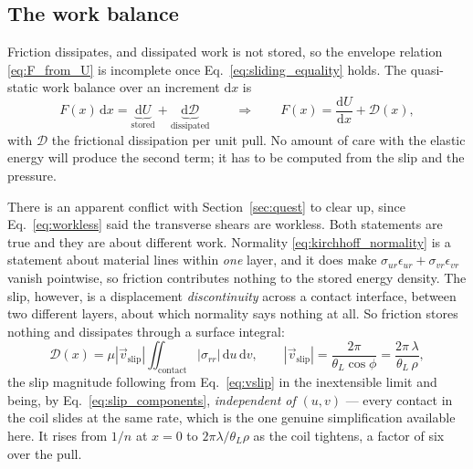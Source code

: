 \documentclass[11pt]{article}
\begin{document}
\subsection{The work balance}\label{sec:work_balance}
Friction dissipates,
and dissipated work is not stored, so the envelope relation
\eqref{eq:F_from_U} is incomplete once Eq.~\eqref{eq:sliding_equality} holds.
The quasi-static work balance over an increment $\mathrm dx$ is
\begin{equation}\label{eq:work_balance}
    \boxed{\;F\left(x\right)\,\mathrm dx
      = \underbrace{\mathrm dU}_{\text{stored}}
      + \underbrace{\mathrm d\mathcal D}_{\text{dissipated}}
    \qquad\Longrightarrow\qquad
    F\left(x\right) = \frac{\mathrm d U}{\mathrm d x}
      + \mathcal D\left(x\right),\;}
\end{equation}
with $\mathcal D$ the frictional dissipation per unit pull. No amount of care
with the elastic energy will produce the second term; it has to be computed from
the slip and the pressure.

There is an apparent conflict with Section~\ref{sec:quest} to clear up, since
Eq.~\eqref{eq:workless} said the transverse shears are workless. Both statements
are true and they are about different work. Normality
\eqref{eq:kirchhoff_normality} is a statement about material lines within
\emph{one} layer, and it does make $\sigma_{ur}\epsilon_{ur}
+ \sigma_{vr}\epsilon_{vr}$ vanish pointwise, so friction contributes nothing to
the stored energy density. The slip, however, is a displacement
\emph{discontinuity} across a contact interface, between two different layers,
about which normality says nothing at all. So friction stores nothing and
dissipates through a surface integral:
\begin{equation}\label{eq:dissipation}
    \boxed{\;\mathcal D\left(x\right)
      = \mu\left|\vec v_{\mathrm{slip}}\right|
        \iint_{\mathrm{contact}}\left|\sigma_{rr}\right|
        \,\mathrm du\,\mathrm dv,
    \qquad
    \left|\vec v_{\mathrm{slip}}\right|
      = \frac{2\pi}{\theta_L\cos\phi} = \frac{2\pi\,\lambda}{\theta_L\,\rho},\;}
\end{equation}
the slip magnitude following from Eq.~\eqref{eq:vslip} in the inextensible limit
and being, by Eq.~\eqref{eq:slip_components}, \emph{independent of} $(u,v)$ ---
every contact in the coil slides at the same rate, which is the one genuine
simplification available here. It rises from $1/n$ at $x=0$ to
$2\pi\lambda/\theta_L\rho$ as the coil tightens, a factor of six over the pull.
\end{document}
